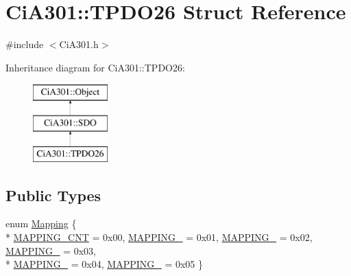 \hypertarget{struct_ci_a301_1_1_t_p_d_o26}{}\section{Ci\+A301\+:\+:T\+P\+D\+O26 Struct Reference}
\label{struct_ci_a301_1_1_t_p_d_o26}


{\ttfamily \#include $<$Ci\+A301.\+h$>$}

Inheritance diagram for Ci\+A301\+:\+:T\+P\+D\+O26\+:\begin{figure}[H]
\begin{center}
\leavevmode
\includegraphics[height=3.000000cm]{d1/da0/struct_ci_a301_1_1_t_p_d_o26}
\end{center}
\end{figure}
\subsection*{Public Types}
\begin{DoxyCompactItemize}
\item 
enum \hyperlink{struct_ci_a301_1_1_t_p_d_o26_ad26fbc2e8ca095342bf5ca3ad7b3a568}{Mapping} \{ \\*
\hyperlink{struct_ci_a301_1_1_t_p_d_o26_ad26fbc2e8ca095342bf5ca3ad7b3a568a65c22c821b136b05d44fc7212851d29e}{M\+A\+P\+P\+I\+N\+G\+\_\+\+C\+N\+T} = 0x00, 
\hyperlink{struct_ci_a301_1_1_t_p_d_o26_ad26fbc2e8ca095342bf5ca3ad7b3a568a63899665bdb19bfede91de2dd2d3bfdd}{M\+A\+P\+P\+I\+N\+G\+\_} = 0x01, 
\hyperlink{struct_ci_a301_1_1_t_p_d_o26_ad26fbc2e8ca095342bf5ca3ad7b3a568a9229c49da4305df3f4123c998a811309}{M\+A\+P\+P\+I\+N\+G\+\_} = 0x02, 
\hyperlink{struct_ci_a301_1_1_t_p_d_o26_ad26fbc2e8ca095342bf5ca3ad7b3a568aba0cd6d82630852876cb19619f20b525}{M\+A\+P\+P\+I\+N\+G\+\_} = 0x03, 
\\*
\hyperlink{struct_ci_a301_1_1_t_p_d_o26_ad26fbc2e8ca095342bf5ca3ad7b3a568a7da0896c5958e41e0565bfd92f7a0fcb}{M\+A\+P\+P\+I\+N\+G\+\_} = 0x04, 
\hyperlink{struct_ci_a301_1_1_t_p_d_o26_ad26fbc2e8ca095342bf5ca3ad7b3a568a9166dd42bc1fd26e6f10ff1a880d196e}{M\+A\+P\+P\+I\+N\+G\+\_} = 0x05
 \}
\end{DoxyCompactItemize}
